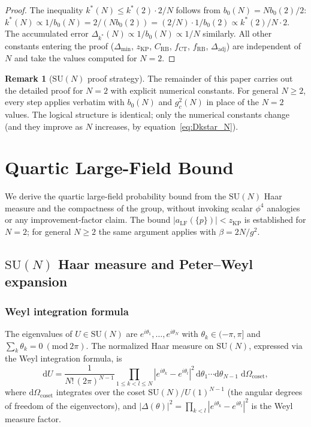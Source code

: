\documentclass[11pt,a4paper]{amsart}
\theoremstyle{definition}
\newtheorem{remark}[theorem]{Remark}
\newcommand{\SU}{\mathrm{SU}}
\newcommand{\Del}{\Delta_{\min}}
\newcommand{\zKP}{z_{\mathrm{KP}}}
\newcommand{\CRB}{C_{\mathrm{RB}}}
\newcommand{\CT}{\mathrm{CT}}
\begin{document}
\begin{proof}
The inequality $k^*(N) \le k^*(2)\cdot 2/N$ follows from $b_0(N) = N b_0(2)/2$:
$k^*(N) \propto 1/b_0(N) = 2/(N b_0(2)) = (2/N)\cdot 1/b_0(2) \propto k^*(2)/N\cdot 2$.
The accumulated error $\Delta_{k^*}(N) \propto 1/b_0(N) \propto 1/N$ similarly.
All other constants entering the proof ($\Del$, $\zKP$, $\CRB$, $f_{\CT}$, $f_{\mathrm{RB}}$,
$\Delta_{\mathrm{adj}}$) are independent of $N$ and take the values computed for $N=2$.
\end{proof}

\begin{remark}[$\SU(N)$ proof strategy]
The remainder of this paper carries out the detailed proof for $N = 2$
with explicit numerical constants.  For general $N \ge 2$, every step
applies verbatim with $b_0(N)$ and $g^2_c(N)$ in place of the
$N=2$ values.  The logical structure is identical; only the numerical constants
change (and they improve as $N$ increases, by equation~\eqref{eq:Dkstar_N}).
\end{remark}

\section{Quartic Large-Field Bound}
\label{sec:quartic}

We derive the quartic large-field probability bound from the
$\SU(N)$ Haar measure and the compactness of the group, without invoking
scalar $\phi^4$ analogies or any improvement-factor claim.
The bound $|a_{\mathrm{LF}}(\{p\})| < \zKP$ is established for $N=2$;
for general $N \ge 2$ the same argument applies with $\beta = 2N/g^2$.

\subsection{$\SU(N)$ Haar measure and Peter--Weyl expansion}
\label{sec:SUN_PW}

\subsubsection*{Weyl integration formula}

The eigenvalues of $U \in \SU(N)$ are $e^{i\theta_1},\ldots,e^{i\theta_N}$
with $\theta_k \in (-\pi,\pi]$ and $\sum_k \theta_k = 0\ (\mathrm{mod}\ 2\pi)$.
The normalized Haar measure on $\SU(N)$, expressed via the Weyl integration formula,
is
\begin{equation}
\label{eq:Haar_SUN}
  \mathrm{d}U
  = \frac{1}{N!\,(2\pi)^{N-1}}
    \prod_{1\le k < l \le N}|e^{i\theta_k} - e^{i\theta_l}|^2\,
    \mathrm{d}\theta_1\cdots\mathrm{d}\theta_{N-1}
    \;\mathrm{d}\Omega_{\mathrm{coset}},
\end{equation}
where $\mathrm{d}\Omega_{\mathrm{coset}}$ integrates over the coset
$\SU(N)/U(1)^{N-1}$ (the angular degrees of freedom of the eigenvectors),
and $|\Delta(\theta)|^2 = \prod_{k<l}|e^{i\theta_k}-e^{i\theta_l}|^2$
is the Weyl measure factor.
\end{document}
